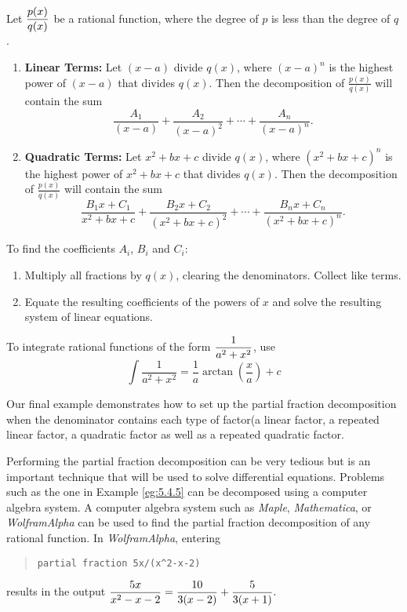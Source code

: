{Let $\displaystyle \frac{p(x)}{q(x)}$ be a rational function, where the degree of $p$ is less than the degree of $q$.
\begin{enumerate}[1)]
	\item	\textbf{Linear Terms:} Let $(x-a)$ divide $q(x)$, where $(x-a)^n$ is the highest power of $(x-a)$ that divides $q(x)$. Then the decomposition of $\frac{p(x)}{q(x)}$ will contain the sum
	$$\frac{A_1}{(x-a)} + \frac{A_2}{(x-a)^2} + \cdots +\frac{A_n}{(x-a)^n}.$$
	\item		\textbf{Quadratic Terms:} Let $x^2+bx+c$ divide $q(x)$, where $(x^2+bx+c)^n$ is the highest power of $x^2+bx+c$ that divides $q(x)$. Then the decomposition of $\frac{p(x)}{q(x)}$ will contain the sum 
	$$\frac{B_1x+C_1}{x^2+bx+c}+\frac{B_2x+C_2}{(x^2+bx+c)^2}+\cdots+\frac{B_nx+C_n}{(x^2+bx+c)^n}.$$
	\end{enumerate}
	To find the coefficients $A_i$, $B_i$ and $C_i$:
	\begin{enumerate}[1)]
	\item	Multiply all fractions by $q(x)$, clearing the denominators. Collect like terms.
	\item		Equate the resulting coefficients of the powers of $x$ and solve the resulting system of linear equations.
	\end{enumerate}
	To integrate rational functions of the form  $\displaystyle \frac{1}{a^2 + x^2}$,  use
	$$\int \frac{1}{a^2 + x^2} = \frac{1}{a} \arctan\left( \frac{x}{a} \right) + c $$
} %







Our final example demonstrates how to set up the partial fraction decomposition when the denominator contains each type of factor(a linear factor, a repeated linear factor, a quadratic factor as well as a repeated quadratic factor.


Performing the partial fraction decomposition can be very tedious but is an important technique that will be used to solve differential equations. Problems such as the one in Example \ref{eg:5.4.5} can be decomposed using a computer algebra system.
A computer algebra system such as \emph{Maple}, \emph{Mathematica}, or \emph{WolframAlpha} can be used to find the partial fraction decomposition of any rational function.  In \emph{WolframAlpha}, entering 
\begin{quote}
\texttt{partial fraction 5x/(x\^{}2-x-2)}
\end{quote}
results in the output $\displaystyle \frac{5x}{x^2-x-2} = \frac{10}{3(x-2)} + \frac{5}{3(x+1)}.$

